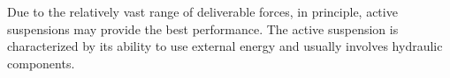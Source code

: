 Due to the relatively vast range of deliverable forces, in principle, active suspensions may provide the best performance.
%
The active suspension is characterized by its ability to use external energy and usually involves hydraulic components.








